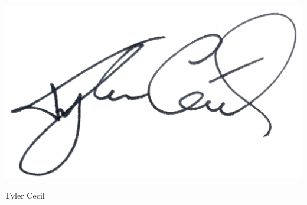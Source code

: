 \documentclass[sans, a4paper, 11pt]{article}
\begin{document}
\begin{adjustwidth}{40pt}{40pt}
  \vspace{-.7em}
  \includegraphics[height=4.5\baselineskip]{sig}
  \vspace{-.8em}

  Tyler Cecil

\end{adjustwidth}
\end{document}
